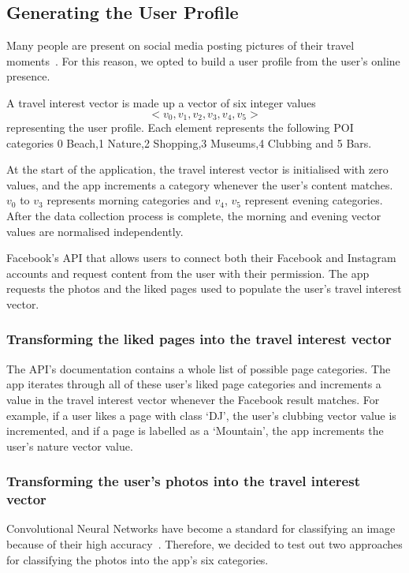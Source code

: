\subsection{Generating the User Profile}

Many people are present on social media posting
pictures of their travel moments~\cite{Miller2016}. For this reason, we opted to
build a user profile from the user's online presence.

A travel interest vector is made up a vector of six integer values
\[<v_0, v_1, v_2, v_3, v_4, v_5>\] representing the user profile.
Each element represents the following POI categories 0 Beach,1 Nature,2
Shopping,3 Museums,4 Clubbing and 5 Bars.
    

At the start of the application, the
travel interest vector is initialised with zero
values, and the app increments a category whenever the
user's content matches. $v_0$ to $v_3$ represents morning categories
and $v_4$, $v_5$ represent evening categories. After
the data collection process is complete, the
morning and evening vector values are normalised independently. 

Facebook's API that allows users to connect both their Facebook
and Instagram accounts and request content from the user with their permission.
The app requests the photos and the liked pages used to 
populate the user's travel interest
vector. 

\subsubsection{Transforming the liked pages into the travel interest vector}

The API's documentation contains a whole list of possible
page categories. 
The app iterates through all of these user's liked
page categories and increments a value in the travel
interest vector whenever the Facebook result matches.
For example, if a user likes a page with class `DJ',
the user's clubbing vector value is incremented, and if a page is labelled as a
`Mountain', the app increments the user's nature vector value.

\subsubsection{Transforming the user's photos into the travel interest vector}


Convolutional Neural Networks have become a standard
for classifying an image because of their high
accuracy~\cite{Zhou2018}. Therefore, we decided to test
out two approaches for classifying the photos into the
app's six categories. 

